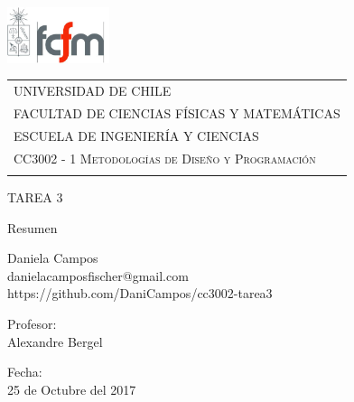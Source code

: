 \begin{titlepage}
  \includegraphics[width=3cm]{logo.png} 
	\hspace{0cm}
  \begin{tabular}{l}
   \small \scshape{UNIVERSIDAD DE CHILE} \\
 	\small \scshape{FACULTAD DE CIENCIAS FÍSICAS Y MATEMÁTICAS} \\
 	\small \scshape {ESCUELA DE INGENIERÍA Y CIENCIAS} \\
 	\small \scshape{CC3002 - 1 Metodologías de Diseño y Programación} \\
  \vspace*{0.5cm}\mbox{}
  \end{tabular}

\vspace*{3.5 cm}
  
\begin{center}
\fontsize{8mm}{9mm}\selectfont 
	TAREA 3
	
	Resumen

	\vspace*{0.8 cm}
  

\vspace*{3.5 cm}

	\normalsize{Daniela Campos} \\
	\normalsize{danielacamposfischer@gmail.com}\\
	\normalsize{https://github.com/DaniCampos/cc3002-tarea3}




	\vspace{0.5 cm}

	
	\footnotesize{Profesor:} \\
	\vspace{0.08 cm}
	\normalsize{Alexandre Bergel} \\
	
	\vspace{0.5 cm}

	

	\footnotesize{Fecha:} \\
	\vspace{0.08 cm}
	\normalsize{25 de Octubre del 2017} \\


\end{center}

\end{titlepage}

%